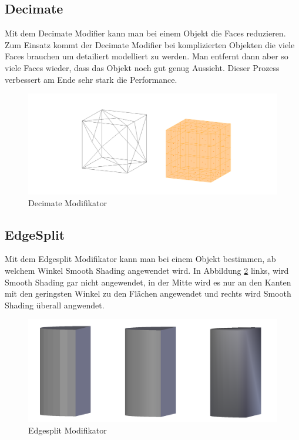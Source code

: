 \subsection{Decimate}
Mit dem Decimate Modifier \citep{blender:decimate_modifier} kann man bei einem Objekt die Faces reduzieren. Zum Einsatz kommt der
Decimate Modifier bei komplizierten Objekten die viele Faces brauchen um detailiert modelliert zu werden. Man entfernt dann aber so viele Faces wieder, dass das Objekt
noch gut genug Aussieht. Dieser Prozess verbessert am Ende sehr stark die Performance.
\begin{figure}[h]
    \centering
    \includegraphics[width=.8\textwidth]{images/Modifikatoren-Decimate.png}
    \caption{Decimate Modifikator}
    \label{modifikatoren:image6}
\end{figure}

\subsection{EdgeSplit}
Mit dem Edgesplit Modifikator kann man \citep{blender:edgesplit_modifier} bei einem Objekt bestimmen, ab welchem Winkel Smooth Shading angewendet wird.
In Abbildung \ref{modifikatoren:image7} links, wird Smooth Shading gar nicht angewendet, in der Mitte wird es nur an den Kanten mit den geringsten Winkel zu den Flächen
angewendet und rechts wird Smooth Shading überall angwendet.
\begin{figure}[h]
    \centering
    \includegraphics[width=.8\textwidth]{images/Modifikatoren-Edgesplit.png}
    \caption{Edgesplit Modifikator}
    \label{modifikatoren:image7}
\end{figure}
